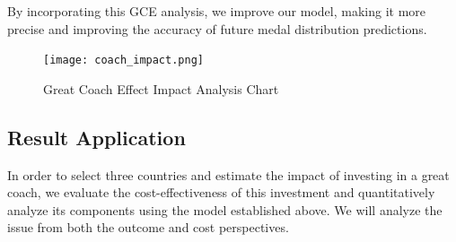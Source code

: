 \documentclass{mcmthesis}
\begin{document}
By incorporating this GCE analysis, we improve our model, making it more precise and improving the accuracy of future medal distribution predictions.


\begin{figure}[h!]
    \centering
    \texttt{[image: coach\_impact.png]}
    \caption{Great Coach Effect Impact Analysis Chart}
    \label{fig:coach_impact}
\end{figure}


\subsection{Result Application}

In order to select three countries and estimate the impact of investing in a great coach, we evaluate the cost-effectiveness of this investment and quantitatively analyze its components using the model established above.
We will analyze the issue from both the outcome and cost perspectives.
\end{document}

